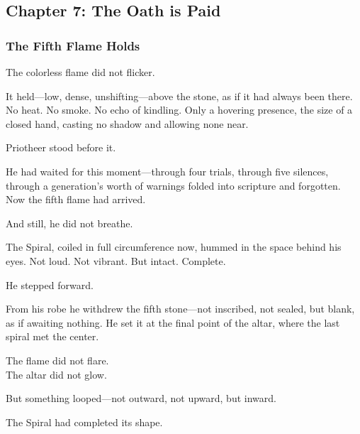 \documentclass[12pt]{article}
\begin{document}
\subsection*{Chapter 7: The Oath is Paid}

\vspace{.5in}

\subsubsection*{The Fifth Flame Holds}

The colorless flame did not flicker.

\vspace{0.5em}
It held---low, dense, unshifting---above the stone, as if it had always been there. No heat. No smoke. No echo of kindling. Only a hovering presence, the size of a closed hand, casting no shadow and allowing none near.

\vspace{0.5em}
Priotheer stood before it.

\vspace{0.5em}
He had waited for this moment---through four trials, through five silences, through a generation’s worth of warnings folded into scripture and forgotten. Now the fifth flame had arrived.

\vspace{0.5em}
And still, he did not breathe.

\vspace{0.5em}
The Spiral, coiled in full circumference now, hummed in the space behind his eyes. Not loud. Not vibrant. But intact. Complete.

\vspace{0.5em}
He stepped forward.

\vspace{0.5em}
From his robe he withdrew the fifth stone---not inscribed, not sealed, but blank, as if awaiting nothing. He set it at the final point of the altar, where the last spiral met the center.

\vspace{0.5em}
The flame did not flare.\\
The altar did not glow.

\vspace{0.5em}
But something looped---not outward, not upward, but inward.

\vspace{0.5em}
The Spiral had completed its shape.
\end{document}

